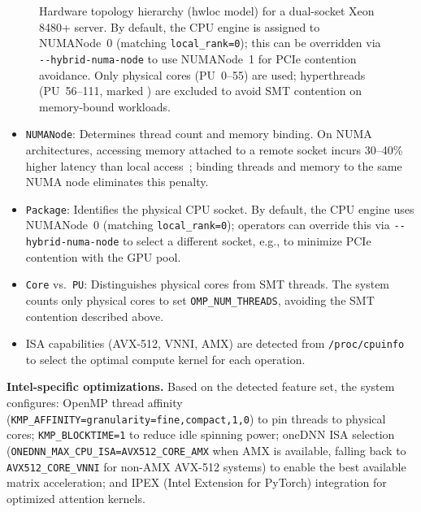 \documentclass[10pt,conference]{IEEEtran}
\begin{document}
\begin{figure}[t]
{%
}
\caption{Hardware topology hierarchy (hwloc model) for a dual-socket Xeon 8480+ server. By default, the CPU engine is assigned to NUMANode~0 (matching \texttt{local\_rank=0}); this can be overridden via \texttt{-{}-hybrid-numa-node} to use NUMANode~1 for PCIe contention avoidance. Only physical cores (PU~0--55) are used; hyperthreads (PU~56--111, marked \texttimes) are excluded to avoid SMT contention on memory-bound workloads.}
\label{fig:hwloc}
\end{figure}
\begin{itemize}
\item \texttt{NUMANode}: Determines thread count and memory binding. On NUMA architectures, accessing memory attached to a remote socket incurs 30--40\% higher latency than local access~\cite{lameter2013numa}; binding threads and memory to the same NUMA node eliminates this penalty.
\item \texttt{Package}: Identifies the physical CPU socket. By default, the CPU engine uses NUMANode~0 (matching \texttt{local\_rank=0}); operators can override this via \texttt{-{}-hybrid-numa-node} to select a different socket, e.g., to minimize PCIe contention with the GPU pool.
\item \texttt{Core} vs.\ \texttt{PU}: Distinguishes physical cores from SMT threads. The system counts only physical cores to set \texttt{OMP\_NUM\_THREADS}, avoiding the SMT contention described above.
\item ISA capabilities (AVX-512, VNNI, AMX) are detected from \texttt{/proc/cpuinfo} to select the optimal compute kernel for each operation.
\end{itemize}

\textbf{Intel-specific optimizations.}
Based on the detected feature set, the system configures: OpenMP thread affinity (\texttt{KMP\_AFFINITY=granularity=fine,compact,1,0}) to pin threads to physical cores; \texttt{KMP\_BLOCKTIME=1} to reduce idle spinning power; oneDNN ISA selection (\texttt{ONEDNN\_MAX\_CPU\_ISA=AVX512\_CORE\_AMX} when AMX is available, falling back to \texttt{AVX512\_CORE\_VNNI} for non-AMX AVX-512 systems) to enable the best available matrix acceleration; and IPEX (Intel Extension for PyTorch) integration for optimized attention kernels.
\end{document}
